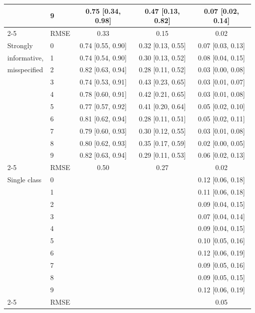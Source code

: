 \begin{tabular}{llccc}
 & 9 & 0.75 [0.34, 0.98] & 0.47 [0.13, 0.82] & 0.07 [0.02, 0.14] \\
\cmidrule{2-5}
 & RMSE & 0.33 & 0.15 & 0.02 \\
\midrule
Strongly & 0 & 0.74 [0.55, 0.90] & 0.32 [0.13, 0.55] & 0.07 [0.03, 0.13] \\
informative, & 1 & 0.74 [0.54, 0.90] & 0.30 [0.13, 0.52] & 0.08 [0.04, 0.15] \\
misspecified & 2 & 0.82 [0.63, 0.94] & 0.28 [0.11, 0.52] & 0.03 [0.00, 0.08] \\
 & 3 & 0.74 [0.53, 0.91] & 0.43 [0.23, 0.65] & 0.03 [0.01, 0.07] \\
 & 4 & 0.78 [0.60, 0.91] & 0.42 [0.21, 0.65] & 0.03 [0.01, 0.08] \\
 & 5 & 0.77 [0.57, 0.92] & 0.41 [0.20, 0.64] & 0.05 [0.02, 0.10] \\
 & 6 & 0.81 [0.62, 0.94] & 0.28 [0.11, 0.51] & 0.05 [0.02, 0.11] \\
 & 7 & 0.79 [0.60, 0.93] & 0.30 [0.12, 0.55] & 0.03 [0.01, 0.08] \\
 & 8 & 0.80 [0.62, 0.93] & 0.35 [0.17, 0.59] & 0.02 [0.00, 0.05] \\
 & 9 & 0.82 [0.63, 0.94] & 0.29 [0.11, 0.53] & 0.06 [0.02, 0.13] \\
\cmidrule{2-5}
 & RMSE & 0.50 & 0.27 & 0.02 \\
\midrule
Single class & 0 &  &  & 0.12 [0.06, 0.18] \\
 & 1 &  &  & 0.11 [0.06, 0.18] \\
 & 2 &  &  & 0.09 [0.04, 0.15] \\
 & 3 &  &  & 0.07 [0.04, 0.14] \\
 & 4 &  &  & 0.09 [0.04, 0.15] \\
 & 5 &  &  & 0.10 [0.05, 0.16] \\
 & 6 &  &  & 0.12 [0.06, 0.19] \\
 & 7 &  &  & 0.09 [0.05, 0.16] \\
 & 8 &  &  & 0.09 [0.05, 0.15] \\
 & 9 &  &  & 0.12 [0.06, 0.19] \\
\cmidrule{2-5}
 & RMSE &  &  & 0.05 \\
\bottomrule
\end{tabular}
